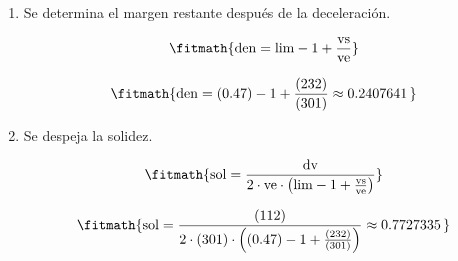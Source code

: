 \begin{enumerate}

\item Se determina el margen restante después de la deceleración.

\[\fitmath{\mathrm{den}=\mathrm{lim}-1+\frac{\mathrm{vs}}{\mathrm{ve}}}\]

\[\fitmath{\mathrm{den}=(0.47)-1+\frac{(232)}{(301)}\approx 0.2407641\,}\]

\item Se despeja la solidez.

\[\fitmath{\mathrm{sol}=\frac{\mathrm{dv}}{2\cdot \mathrm{ve}\cdot \left(\mathrm{lim}-1+\frac{\mathrm{vs}}{\mathrm{ve}}\right)}}\]

\[\fitmath{\mathrm{sol}=\frac{(112)}{2\cdot (301)\cdot \left((0.47)-1+\frac{(232)}{(301)}\right)}\approx 0.7727335\,}\]

\end{enumerate}
